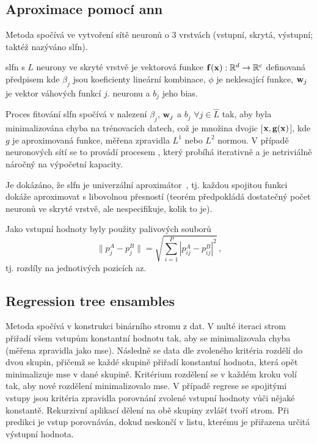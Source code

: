 \subsection{Aproximace pomocí \acs{ann}}
Metoda spočívá ve vytvoření sítě neuronů o 3 vrstvách (vstupní, skrytá, výstupní; taktéž nazýváno \ac{slfn}). 
\begin{define} 
	\ac{slfn} s $L$ neurony ve skryté vrstvě je vektorová funkce $\mathbf{f(x)}: \mathbb{R}^d \rightarrow \mathbb{R}^c$ definovaná předpisem
	kde $\beta_j$ jsou koeficienty lineární kombinace, $\phi$ je neklesající funkce, $\mathbf{w}_j$ je vektor váhových funkcí $j$. neuronu a $b_j$ 
	jeho bias.
\end{define}
Proces fitování \ac{slfn} spočívá v nalezení $\beta_j$, $\mathbf{w}_j$ a $b_j$ $\forall j \in\hat{L}$ tak, aby byla minimalizována chyba na 
trénovacích datech, což je množina dvojic [$\mathbf{x}, \mathbf{g(x)}$], kde $g$ je aproximovaná funkce, měřena zpravidla $L^1$ nebo $L^2$ normou. 
V případě neuronových sítí se to provádí procesem , který probíhá iterativně a je netriviálně náročný na výpočetní kapacity. 

Je dokázáno, že \ac{slfn} je univerzální aproximátor~\cite{hornik}, tj. každou spojitou funkci dokáže aproximovat s libovolnou přesností (teorém předpokládá 
dostatečný počet neuronů ve skryté vrstvě, ale nespecifikuje, kolik to je).

Jako vstupní hodnoty byly použity  palivových souborů
\begin{equation}
	\|p_j^A - p_j^B\| = \sqrt{\sum_{i=1}^P |p_{ij}^A - p_{ij}^B|^2}\,,
	\label{eq:fa-norm}
\end{equation}
tj. rozdíly na jednotivých pozicích \ac{az}.

\subsection{Regression tree ensambles}
Metoda spočívá v konstrukci binárního stromu z dat. V nulté iteraci strom přiřadí všem vstupům konstantní hodnotu tak, aby se minimalizovala chyba 
(měřena zpravidla jako \ac{mse}). Následně se data dle zvoleného kritéria rozdělí do dvou skupin, přičemž se každé skupině přiřadí konstantní hodnota, která 
opět minimalizuje \ac{mse} v dané skupině. Kritérium rozdělení se v každém kroku volí tak, aby nové rozdělení minimalizovalo \ac{mse}. V případě regrese se 
spojitými vstupy jsou kritéria zpravidla porovnání zvolené vstupní hodnoty vůči nějaké konstantě. Rekurzivní aplikací dělení na obě skupiny zvlášť 
tvoří strom. Při predikci je vstup porovnáván, dokud neskončí v listu, kterému je přiřazena určitá výstupní hodnota. 

